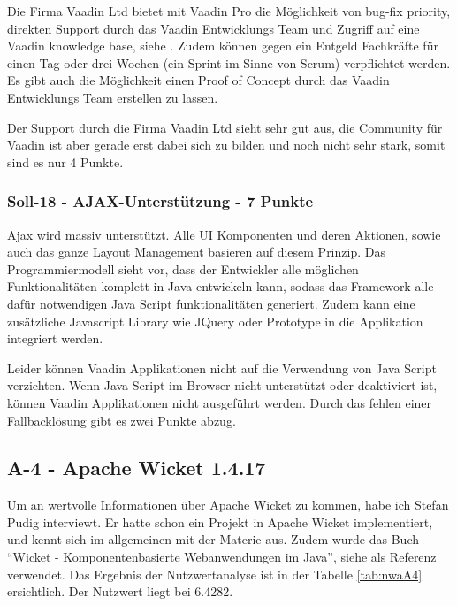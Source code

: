   Die Firma Vaadin Ltd bietet mit Vaadin Pro die Möglichkeit von bug-fix
  priority, direkten Support durch das Vaadin Entwicklungs Team und Zugriff auf
  eine Vaadin knowledge base, siehe \cite{VaadinPro}. Zudem können gegen ein
  Entgeld Fachkräfte für einen Tag oder drei Wochen (ein Sprint im Sinne von
  Scrum) verpflichtet werden. Es gibt auch die Möglichkeit einen Proof of
  Concept durch das Vaadin Entwicklungs Team erstellen zu lassen.
  
  Der Support durch die Firma Vaadin Ltd sieht sehr gut aus, die Community für
  Vaadin ist aber gerade erst dabei sich zu bilden und noch nicht sehr stark, somit
  sind es nur 4 Punkte.

  \subsubsection{Soll-18 - AJAX-Unterstützung - 7 Punkte}
  
  \ac{Ajax} wird massiv unterstützt. Alle \ac{UI} Komponenten und deren
  Aktionen, sowie auch das ganze Layout Management basieren auf diesem Prinzip.
  Das Programmiermodell sieht vor, dass der Entwickler alle möglichen
  Funktionalitäten komplett in Java entwickeln kann, sodass das Framework alle
  dafür notwendigen Java Script funktionalitäten generiert. Zudem kann eine
  zusätzliche Javascript Library wie JQuery oder Prototype in die Applikation
  integriert werden.
  
  Leider können Vaadin Applikationen nicht auf die Verwendung von Java
  Script verzichten. Wenn Java Script im Browser nicht unterstützt oder
  deaktiviert ist, können Vaadin Applikationen nicht ausgeführt werden. Durch
  das fehlen einer Fallbacklösung gibt es zwei Punkte abzug.
  
  \subsection{A-4 - Apache Wicket 1.4.17}
  
  Um an wertvolle Informationen über Apache Wicket zu kommen, habe ich Stefan
  Pudig interviewt. Er hatte schon ein Projekt in Apache Wicket implementiert,
  und kennt sich im allgemeinen mit der Materie aus. Zudem wurde das Buch
  ``Wicket - Komponentenbasierte Webanwendungen im Java'', siehe \cite{Wicket} als
  Referenz verwendet. Das Ergebnis der Nutzwertanalyse ist in der Tabelle
  \ref{tab:nwaA4} ersichtlich. Der Nutzwert liegt bei 6.4282.
  

